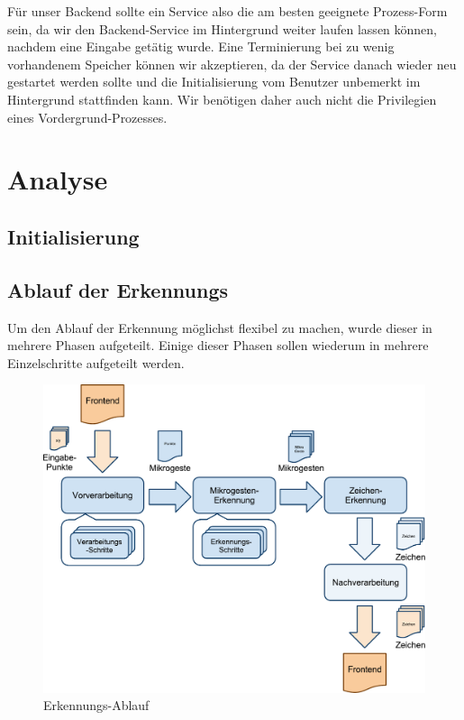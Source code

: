 Für unser Backend sollte ein Service also die am besten geeignete Prozess-Form sein, da wir den Backend-Service im Hintergrund weiter laufen lassen können, nachdem eine Eingabe getätig wurde. Eine Terminierung bei zu wenig vorhandenem Speicher können wir akzeptieren, da der Service danach wieder neu gestartet werden sollte und die Initialisierung vom Benutzer unbemerkt im Hintergrund stattfinden kann. Wir benötigen daher auch nicht die Privilegien eines Vordergrund-Prozesses.

\section{Analyse}

\subsection{Initialisierung}

\subsection{Ablauf der Erkennungs}

Um den Ablauf der Erkennung möglichst flexibel zu machen, wurde dieser in mehrere Phasen aufgeteilt. Einige dieser Phasen sollen wiederum in mehrere Einzelschritte aufgeteilt werden.

\begin{figure}[h]
   \centering
   \includegraphics[scale=0.75, bb=10 0 744 460]{img/erkennungs_ablauf.pdf} 
   \caption{Erkennungs-Ablauf}
   \label{fig:erkennungs_ablauf}
\end{figure}

